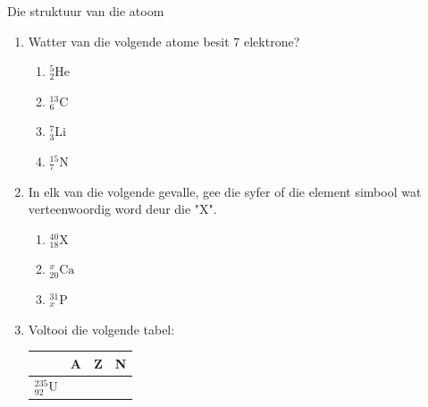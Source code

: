 \begin{exercises}{Die struktuur van die atoom}
\begin{enumerate}[noitemsep, label=\textbf{\arabic*}. ]
Vir die element $_{17}^{35}\text{Cl}$, gee die aantaal ...
\label{m38745*id256843}\begin{enumerate}[noitemsep, label=\textbf{\alph*}. ] 
            \label{m38745*uid25}\item protone
\label{m38745*uid26}\item neutrone
\label{m38745*uid27}\item elektrone
\end{enumerate}
... in die atoom.\newline
\label{m38745*uid28}\item Watter van die volgende atome besit 7 elektrone?
\label{m38745*id256898}\begin{enumerate}[noitemsep, label=\textbf{\alph*}. ] 
            \label{m38745*uid29}\item $_{2}^{5}\text{He}$
\label{m38745*uid30}\item $_{6}^{13}\text{C}$
\label{m38745*uid31}\item $_{3}^{7}\text{Li}$
\label{m38745*uid32}\item $_{7}^{15}\text{N}$
\end{enumerate}
                \label{m38745*uid33}\item 
In elk van die volgende gevalle, gee die syfer of die element simbool wat verteenwoordig word deur die "X".
\label{m38745*id257023}\begin{enumerate}[noitemsep, label=\textbf{\alph*}. ] 
            \label{m38745*uid34}\item $_{18}^{40}\text{X}$
\label{m38745*uid35}\item $_{20}^{x}\text{Ca}$
\label{m38745*uid36}\item $_{x}^{31}\text{P}$
\end{enumerate}
                \label{m38745*uid37}\item 
Voltooi die volgende tabel:
          \begin{table}[H]
        \begin{center}
      \label{m38745*id257121}
    \noindent
      \begin{tabular}{|l|l|l|l|}\hline
         &
        \textbf{A} &
        \textbf{Z} &
        \textbf{N} \\ \hline
        $_{92}^{235}\text{U}$ &
         &
         &
        \\ \hline

\end{tabular}
\end{center}
\end{table}
\end{enumerate}
\end{exercises}

